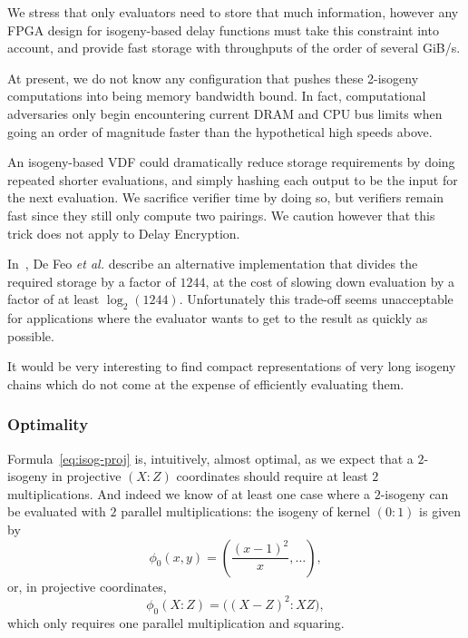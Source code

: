 \documentclass{llncs}
\begin{document}
We stress that only evaluators need to store that much information,
however any FPGA design for isogeny-based delay functions must take
this constraint into account, and provide fast storage with
throughputs of the order of several GiB/s. %

At present, we do not know any configuration that pushes these
2-isogeny computations into being memory bandwidth bound. 
In fact, computational adversaries only begin encountering current
DRAM and CPU bus limits when going an order of magnitude faster
than the hypothetical high speeds above.

An isogeny-based VDF could dramatically reduce storage requirements by
doing repeated shorter evaluations, and simply hashing each output
to be the input for the next evaluation.  We sacrifice verifier time
by doing so, but verifiers remain fast since they still only compute
two pairings.  We caution however
that this trick does not apply to Delay Encryption. 

In~\cite{10.1007/978-3-030-34578-5_10}, De Feo \emph{et al.} describe
an alternative implementation that divides the required storage by a
factor of $1244$, at the cost of slowing down evaluation by a factor
of at least $\log_2(1244)$. %
Unfortunately this trade-off seems unacceptable for applications where
the evaluator wants to get to the result as quickly as possible. %

It would be very interesting to find compact representations of very
long isogeny chains which do not come at the expense of efficiently
evaluating them.

\subsubsection{Optimality}
Formula~\eqref{eq:isog-proj} is, intuitively, almost optimal, as we
expect that a $2$-isogeny in projective $(X:Z)$ coordinates should
require at least $2$ multiplications. %
And indeed we know of at least one case where a $2$-isogeny can be
evaluated with $2$ parallel multiplications: the isogeny of kernel
$(0:1)$ is given by
\begin{equation}
  \label{eq:isog-special}
  \phi_0(x,y) = \left(\frac{(x - 1)^2}{x}, \dots\right),
\end{equation}
or, in projective coordinates,
\begin{equation}
  \label{eq:isog-special-proj}
  \phi_0(X:Z) = \bigl((X - Z)^2:XZ\bigr),
\end{equation}
which only requires one parallel multiplication and squaring.
\end{document}
